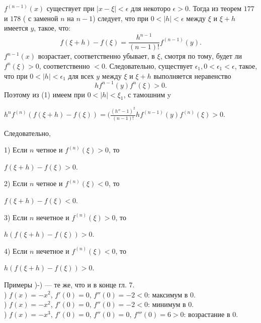 \footnotesize
{}
\linespread{1}
\normalsize
\par{}
$f^{(n-1)}(x)$ существует при $|x-\xi|<\epsilon$ для некоторо $\epsilon>0$. Тогда из теорем $177$ и $178$ ( с заменой $n$ на $n-1$) следует, что при $0<|h|<\epsilon$ между $\xi$ и $\xi+h$ имеется $y$, такое, что:
\begin{equation}\label{formula1}
f(\xi+h)-f(\xi)=\frac{h^{n-1}}{(n-1)!}f^{(n-1)}(y).
\end{equation}
$f^{n-1}(x)$ возрастает, соответственно убывает, в $\xi$, смотря по тому, будет ли $f^n(\xi)>0$, соответственно $<0$. Следовательно, существует $\epsilon_1, 0<\epsilon_1<\epsilon$, такое, что при $0<|h|<\epsilon_1$ для всех $y$ между $\xi$ и $\xi+h$ выполняется неравенство
\begin{equation}\label{formula2}
hf^{n-1}(y)f^n(\xi)>0.
\end{equation}
Поэтому из (1) имеем при $0<|h|<\xi_1$, с тамошним y
\begin{center}$h^{n}f^{(n)}(f(\xi+h)-f(\xi))=(\frac{(h''-1)^2}{(n-1)!}hf^{(n-1)}(y)f^{(n)}(\xi)>0$.\end{center}
Следовательно,
\par1) Если $n$ четное и $f^{(n)}(\xi)>0$, то
\begin{center}$f(\xi+h)-f(\xi)>0$.\end{center}
\par2) Если $n$ четное и $f^{(n)}(\xi)<0$, то
\begin{center}$f(\xi+h)-f(\xi)<0$.\end{center}
\par3) Если $n$ нечетное и $f^{(n)}(\xi)>0$, то
\begin{center}$h(f(\xi+h)-f(\xi))>0$.\end{center}
\par4) Если $n$ нечетное и $f^{(n)}(\xi)<0$, то
\begin{center}$h(f(\xi+h)-f(\xi))>0$.\end{center}
Примеры )-) --- те же, что и в конце гл. 7.\\
) $f(x)=-x^2$, $f'(0)=0$, $f''(0)=-2<0$: максимум в 0.\\
) $f(x)=-x^2$, $f'(0)=0$, $f''(0)=-2<0$: минимум в 0.\\
) $f(x)=-x^3$, $f'(0)=0$, $f''(0)=0$, $f'''(0)=6>0$: возрастание в 0.\\
\newpage